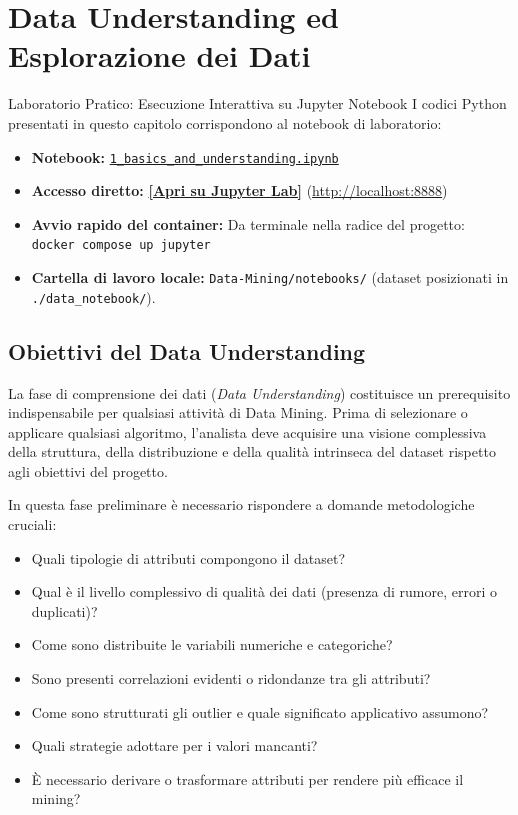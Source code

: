 \chapter{Data Understanding ed Esplorazione dei Dati}
\label{ch:data-understanding}

\begin{noteblock}{Laboratorio Pratico: Esecuzione Interattiva su Jupyter Notebook}
I codici Python presentati in questo capitolo corrispondono al notebook di laboratorio:
\begin{itemize}
    \item \textbf{Notebook:} \href{http://localhost:8888/lab/tree/notebooks/1_basics_and_understanding.ipynb}{\texttt{1\_basics\_and\_understanding.ipynb}}
    \item \textbf{Accesso diretto:} \href{http://localhost:8888/lab/tree/notebooks/1_basics_and_understanding.ipynb}{\textbf{[Apri su Jupyter Lab]}} \quad (\url{http://localhost:8888})
    \item \textbf{Avvio rapido del container:} Da terminale nella radice del progetto: \texttt{docker compose up jupyter}
    \item \textbf{Cartella di lavoro locale:} \texttt{Data-Mining/notebooks/} (dataset posizionati in \texttt{./data\_notebook/}).
\end{itemize}
\end{noteblock}

\FloatBarrier
\section{Obiettivi del Data Understanding}

La fase di comprensione dei dati (\textit{Data Understanding}) costituisce un prerequisito indispensabile per qualsiasi attività di Data Mining. Prima di selezionare o applicare qualsiasi algoritmo, l'analista deve acquisire una visione complessiva della struttura, della distribuzione e della qualità intrinseca del dataset rispetto agli obiettivi del progetto.

In questa fase preliminare è necessario rispondere a domande metodologiche cruciali:
\begin{itemize}
    \item Quali tipologie di attributi compongono il dataset?
    \item Qual è il livello complessivo di qualità dei dati (presenza di rumore, errori o duplicati)?
    \item Come sono distribuite le variabili numeriche e categoriche?
    \item Sono presenti correlazioni evidenti o ridondanze tra gli attributi?
    \item Come sono strutturati gli outlier e quale significato applicativo assumono?
    \item Quali strategie adottare per i valori mancanti?
    \item È necessario derivare o trasformare attributi per rendere più efficace il mining?
\end{itemize}

